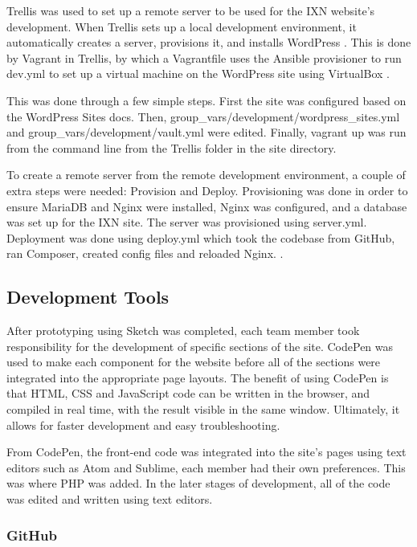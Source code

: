 Trellis was used to set up a remote server to be used for the IXN
website's development. When Trellis sets up a local development
environment, it automatically creates a server, provisions it, and
installs WordPress \cite{p21} . This is done by Vagrant in Trellis, by
which a Vagrantfile uses the Ansible provisioner to run dev.yml to set
up a virtual machine on the WordPress site using VirtualBox \cite{p22} .

This was done through a few simple steps. First the site was configured
based on the WordPress Sites docs. Then,
group\_vars/development/wordpress\_sites.yml and
group\_vars/development/vault.yml were edited. Finally, vagrant up was
run from the command line from the Trellis folder in the site directory.

To create a remote server from the remote development environment, a
couple of extra steps were needed: Provision and Deploy. Provisioning
was done in order to ensure MariaDB and Nginx were installed, Nginx was
configured, and a database was set up for the IXN site. The server was
provisioned using server.yml. Deployment was done using deploy.yml which
took the codebase from GitHub, ran Composer, created config files and
reloaded Nginx. \cite{p23}.

\hypertarget{development-tools}{%
\subsection{Development Tools}\label{development-tools}}

After prototyping using Sketch was completed, each team member took
responsibility for the development of specific sections of the site.
CodePen was used to make each component for the website before all of
the sections were integrated into the appropriate page layouts. The
benefit of using CodePen is that HTML, CSS and JavaScript code can be
written in the browser, and compiled in real time, with the result
visible in the same window. \cite{p19} Ultimately, it allows for faster
development and easy troubleshooting.

From CodePen, the front-end code was integrated into the site's pages
using text editors such as Atom and Sublime, each member had their own
preferences. This was where PHP was added. In the later stages of
development, all of the code was edited and written using text editors.

\hypertarget{github}{%
\subsubsection{GitHub}\label{github}}

